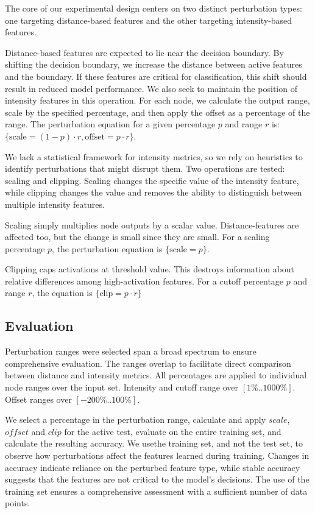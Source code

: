 The core of our experimental design centers on two distinct perturbation types: one targeting distance-based features and the other targeting intensity-based features.

Distance-based features are expected to lie near the decision boundary. By shifting the decision boundary, we increase the distance between active features and the boundary. If these features are critical for classification, this shift should result in reduced model performance. We also seek to maintain the position of intensity features in this operation. For each node, we calculate the output range, scale by the specified percentage, and then apply the offset as a percentage of the range. The perturbation equation for a given percentage $p$ and range $r$ is: $\{\text{scale} = (1 - p) \cdot r, \text{offset} = p \cdot r \}$.

We lack a statistical framework for intensity metrics, so we rely on heuristics to identify perturbations that might disrupt them. Two operations are tested: scaling and clipping. Scaling changes the specific value of the intensity feature, while clipping changes the value and removes the ability to distinguish between multiple intensity features.

Scaling simply multiplies node outputs by a scalar value. Distance-features are affected too, but the change is small since they are small. For a scaling percentage $p$, the perturbation equation is $\{\text{scale} = p\}$.

Clipping caps activations at threshold value. This destroys information about relative differences among high-activation features. For a cutoff percentage $p$ and range $r$, the equation is $\{\text{clip} = p \cdot r\}$

\subsection{Evaluation}

Perturbation ranges were selected span a broad spectrum to ensure comprehensive evaluation. The ranges overlap to facilitate direct comparison between distance and intensity metrics. All percentages are applied to individual node ranges over the input set. Intensity and cutoff range over $[1\%..1000\%]$. Offset ranges over $[-200\%..100\%]$.

We select a percentage in the perturbation range, calculate and apply $scale$, $offset$ and $clip$ for the active test, evaluate on the entire training set, and calculate the resulting accuracy. We usethe training set, and not the test set, to observe how perturbations affect the features learned during training. Changes in accuracy indicate reliance on the perturbed feature type, while stable accuracy suggests that the features are not critical to the model's decisions. The use of the training set ensures a comprehensive assessment with a sufficient number of data points.
